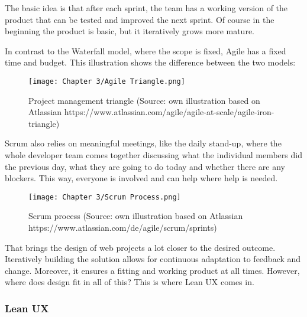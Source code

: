 The basic idea is that after each sprint, the team has a working version of the product that can be
tested and improved the next sprint. Of course in the beginning the product is basic, but it
iteratively grows more mature.

In contrast to the Waterfall model, where the scope is fixed, Agile has a fixed time and budget.
This illustration shows the difference between the two models:
\begin{figure}[H]
    \centering
    \texttt{[image: Chapter 3/Agile Triangle.png]}
    \caption{Project management triangle (Source: own illustration based on Atlassian https://www.atlassian.com/agile/agile-at-scale/agile-iron-triangle)}
\end{figure}

Scrum also relies on meaningful meetings, like the daily stand-up, where the whole developer team
comes together discussing what the individual members did the previous day, what they are going to
do today and whether there are any blockers. This way, everyone is involved and can help where help
is needed. 

\begin{figure}[H]
    \centering
    \texttt{[image: Chapter 3/Scrum Process.png]}
    \caption{Scrum process (Source: own illustration based on Atlassian https://www.atlassian.com/de/agile/scrum/sprints)}
\end{figure}

That brings the design of web projects a lot closer to the desired outcome. Iteratively building the
solution allows for continuous adaptation to feedback and change. Moreover, it ensures a fitting and
working product at all times. However, where does design fit in all of this? This is where Lean UX
comes in. 

\subsubsection{Lean UX}


